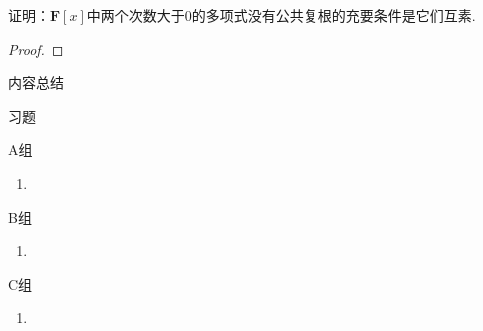 \begin{example}
    证明：$\mathbf{F}[x]$中两个次数大于0的多项式没有公共复根的充要条件是它们互素.
\end{example}
\begin{proof}
    
\end{proof}

\vspace{2ex}
\centerline{\heiti \Large 内容总结}

\vspace{2ex}

\centerline{\heiti \Large 习题}
\vspace{2ex}
{\kaishu }
\begin{flushright}
    \kaishu

\end{flushright}
\centerline{\heiti A组}
\begin{enumerate}
    \item
\end{enumerate}
\centerline{\heiti B组}
\begin{enumerate}
    \item
\end{enumerate}
\centerline{\heiti C组}
\begin{enumerate}
    \item
\end{enumerate}
